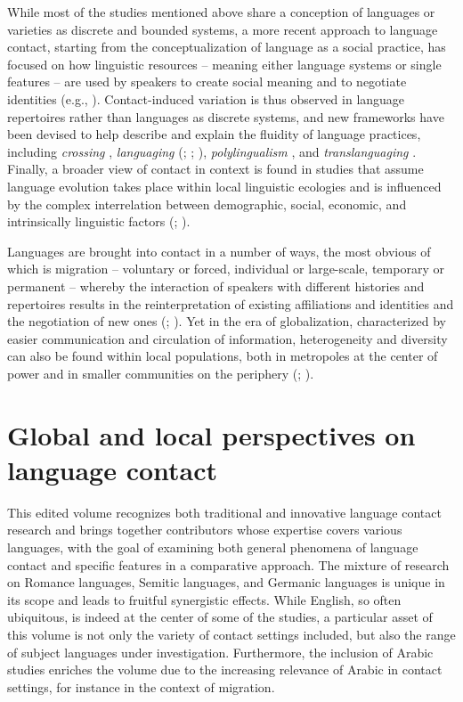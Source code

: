 \documentclass[output=paper
		  ]{langscibook}
\begin{document}
While most of the studies mentioned above share a conception of languages or varieties as discrete and bounded systems, a more recent approach to language contact, starting from the conceptualization of language as a social practice, has focused on how linguistic resources – meaning either language systems or single features – are used by speakers to create social meaning and to negotiate identities (e.g., \citealt{sanchez_moreano_practicas_2021}). Contact-induced variation is thus observed in language repertoires rather than languages as discrete systems, and new frameworks have been devised to help describe and explain the fluidity of language practices, including \textit{crossing} \citep{rampton_crossing_1995}, \textit{languaging} (\citealt{canagarajah_ecology_2007}; \citealt{makoni_disinventing_2007}; \citealt{jorgensen_languaging_2011}), \textit{polylingualism} \citep{jorgensen_polylingual_2008}, and \textit{translanguaging} \citep{garcia_translanguaging_2014}. Finally, a broader view of contact in context is found in studies that assume language evolution takes place within local linguistic ecologies and is influenced by the complex interrelation between demographic, social, economic, and intrinsically linguistic factors (\citealt{mufwene_ecology_2001}; \citealt{pennycook_language_2010}). 

Languages are brought into contact in a number of ways, the most obvious of which is migration – voluntary or forced, individual or large-scale, temporary or permanent – whereby the interaction of speakers with different histories and repertoires results in the reinterpretation of existing affiliations and identities and the negotiation of new ones (\citealt{aalberse_heritage_2019}; \citealt{canagarajah_changing_2019}). Yet in the era of globalization, characterized by easier communication and circulation of information, heterogeneity and diversity can also be found within local populations, both in metropoles at the center of power and in smaller communities on the periphery (\citealt{blommaert_sociolinguistics_2010}; \citealt{pietikainen_sociolinguistics_2016}).

\section{Global and local perspectives on language contact}

This edited volume recognizes both traditional and innovative language contact research and brings together contributors whose expertise covers various languages, with the goal of examining both general phenomena of language contact and specific features in a comparative approach. The mixture of research on Romance languages, Semitic languages, and Germanic languages is unique in its scope and leads to fruitful synergistic effects. While English, so often ubiquitous, is indeed at the center of some of the studies, a particular asset of this volume is not only the variety of contact settings included, but also the range of subject languages under investigation. Furthermore, the inclusion of Arabic studies enriches the volume due to the increasing relevance of Arabic in contact settings, for instance in the context of migration.
\end{document}
